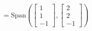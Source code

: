 \documentclass[preview]{standalone}
\begin{document}
\begin{align*}
= \text{Span}\left(\begin{bmatrix} 1 \\ 1 \\ -1 \end{bmatrix}, \begin{bmatrix} 2 \\ 2 \\ -1 \end{bmatrix}\right)
\end{align*}
\end{document}
